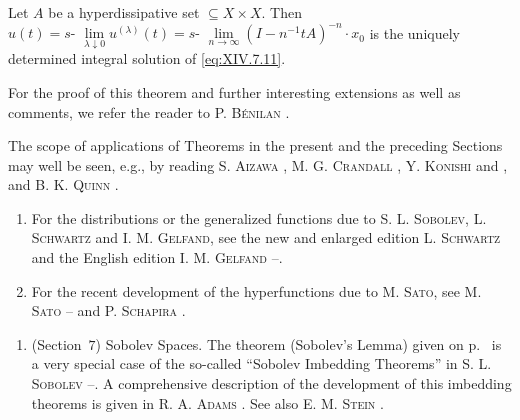 \begin{theorem}\label{thm:XIV.7.Theorem.4} Let $A$ be a hyperdissipative set $\subseteq X \times X$. Then $u(t) = s\text{- }\lim\limits_{\lambda \downarrow 0} u^{(\lambda)}(t) = s\text{- }\lim\limits_{n \to \infty} (I - n^{-1}tA)^{-n} \cdot x_0$ is the uniquely determined integral solution of \eqref{eq:XIV.7.11}. 
\end{theorem}

For the proof of this theorem and further interesting extensions as well as comments, we refer the reader to P. \textsc{Bénilan} \cite{benilan14}. 

\begin{remarku} The scope of applications of Theorems in the present and the preceding Sections may well be seen, e.g., by reading S. \textsc{Aizawa} \cite{aizawa4}, M. G. \textsc{Crandall} \cite{clarkson38}, Y. \textsc{Konishi} \cite{konishi160} and \cite{konishi161}, and B. K. \textsc{Quinn} \cite{quinn265}. 
\end{remarku}

\label{chap:SupplementaryNotes}

\label{notes:I-VI}

\begin{enumerate}[1.]
\item For the distributions or the generalized functions due to S. L. \textsc{Sobolev}, L. \textsc{Schwartz} and I. M. \textsc{Gelfand}, see the new and enlarged edition L. \textsc{Schwartz} \cite{schwartz299} and the English edition I. M. \textsc{Gelfand} \cite{gelfand80}--\cite{gelfand84}.
\item For the recent development of the hyperfunctions due to M. \textsc{Sato}, see M. \textsc{Sato} \cite{sato285}--\cite{sato286} and P. \textsc{Schapira} \cite{schapira287}.
\end{enumerate}

\label{notes:VI}

\begin{enumerate}[1.]
\item (Section~\hyperref[sec:VI.7]{$7$}) Sobolev Spaces. The theorem (Sobolev's Lemma) given on p.~\pageref{thm:VI.7.Sobolev} is a very special case of the so-called ``Sobolev Imbedding Theorems'' in S. L. \textsc{Sobolev} \cite{sobolev306}--\cite{sobolev307}. A comprehensive description of the development of this imbedding theorems is given in R. A. \textsc{Adams} \cite{adams2}. See also E. M. \textsc{Stein} \cite{stein310}.
\end{enumerate}

